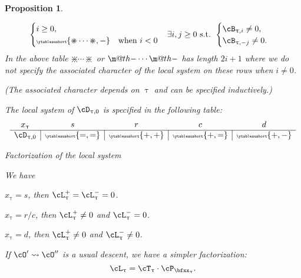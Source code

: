 \documentclass[12pt,a4paper]{amsart}
\makeatletter
\numberwithin{equation}{section}
\newtheorem{prop}[thm]{Proposition}
\theoremstyle{remark}
\let\ytb=\ytableaushort
\newcommand{\tytb}[1]{{\tiny\ytb{#1}}}
\newcommand{\dotminus}{\mathbin{\text{\@dotminus}}}
\newcommand{\@dotminus}{%
  \ooalign{\hidewidth\raise1ex\hbox{.}\hidewidth\cr$\m@th-$\cr}%
}
\def\cOp{\cO^{\prime}}
\def\cOpp{\cO^{\prime\prime}}
\def\pcL{\cL^+}
\def\ncL{\cL^-}
\def\uum{{\dotminus}}
\def\uup{\divideontimes}
\makeatother
\begin{document}
\begin{prop}
\begin{enumS}
{\begin{table}[pb]
\[\begin{array}{c|c|c|c}
\begin{cases}
{                                    } i\geq 0,\\
                                    \tytb{\uup\cdots\uup,-} & \text{when }i <0
                                  \end{cases}
                                  &  \exists i,j\geq 0 \text{ s.t. }
                                    \begin{cases}
                                      \cB_{\uptau,i}\neq 0,\\%
                                      \cB_{\uptau,-j}\neq 0.%
                                    \end{cases}

      \end{array}
    \]
  In the above table $\uup\cdots\uup$ or $\uum\cdots\uum$ has length $2i+1$
  where we do not specify the associated character of the local system on these rows when $i\neq 0$.

  (The associated character depends on $\uptau$ and can be
  specified inductively.)

  The local system of $\cD_{\uptau,0}$ is specified in the following
  table:
  \begin{equation}\label{eq:ls.srcd}
   \begin{array}{c|c|c|c|c}
      x_{\uptau} &  s & r & c &d \\
      \hline
      \cD_{\uptau,0} & \tiny \tytb{=,=} &\tiny \tytb{+,+} & \tiny \tytb{+,=} &\tiny \tytb{+,-}
    \end{array}
  \end{equation}
    \caption{Factorization of the local system}
    \label{tab:ls.factor}
    \label{eq:ls.factor}
  \end{table}
  }
  \item
  We have
  \begin{enumT}
    \item $x_{\uptau} = s$, then $\pcL_{\uptau} = \ncL_{\uptau} = 0$.
    \item $x_{\uptau} = r/c$, then $\pcL_{\uptau} \neq 0$ and $\ncL_{\uptau}=0$.
    \item $x_{\uptau} = d$, then $\pcL_{\uptau}\neq 0$ and $\ncL_{\uptau}\neq 0$.
  \end{enumT}
  \item If $\cOp \leadsto \cOpp$ is a usual descent, we have a simpler
  factorization:
  \begin{equation}\label{eq:d.factor}
    \cL_{\uptau} = \cT_{\uptau}\cdot \cP_{\bfxx_{\uptau}}.
  \end{equation}


\end{enumS}
\end{prop}
\end{document}
